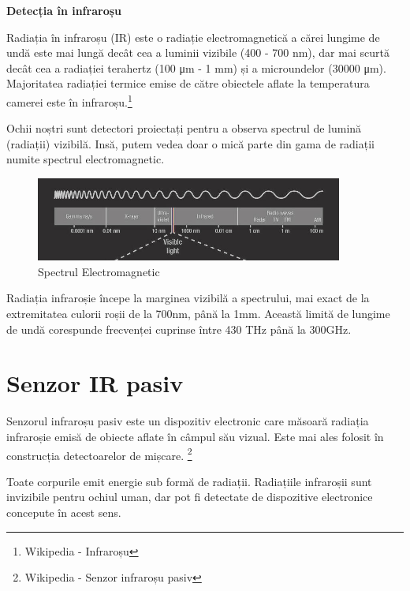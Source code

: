 





\textbf{\LARGE Detecția în infraroșu
}

\vspace{0.5cm}
Radiația în infraroșu (IR) este o radiație electromagnetică a cărei lungime de undă este mai lungă decât cea a luminii vizibile (400 - 700 nm), dar mai scurtă decât cea a radiației terahertz (100 μm - 1 mm) și a microundelor (30000 μm). Majoritatea radiației termice emise de către obiectele aflate la temperatura camerei este în infraroșu.\footnote{Wikipedia - Infraroșu}

Ochii noștri sunt detectori proiectați pentru a observa spectrul de lumină (radiații) vizibilă. Insă, putem vedea doar o mică parte din gama de radiații numite spectrul electromagnetic.

\begin{figure}[h]
    \centering
    \includegraphics[width=0.9\textwidth]{electro.jpg}
    \caption{Spectrul Electromagnetic}
    \label{fig:mesh1}
\end{figure}

Radiația infraroșie începe la marginea vizibilă a spectrului, mai exact de la extremitatea culorii roșii de la 700nm, până la 1mm. Această limită de lungime de undă corespunde frecvenței cuprinse între 430 THz până la 300GHz.

\section{Senzor IR pasiv}

\quad \quad Senzorul infraroșu pasiv este un dispozitiv electronic care măsoară radiația infraroșie emisă de obiecte aflate în câmpul său vizual. Este mai ales folosit în construcția detectoarelor de mișcare. 
\footnote{Wikipedia - Senzor infraroșu pasiv}

\quad Toate corpurile emit energie sub formă de radiații. Radiațiile infraroșii sunt invizibile pentru ochiul uman, dar pot fi detectate de dispozitive electronice concepute în acest sens.

